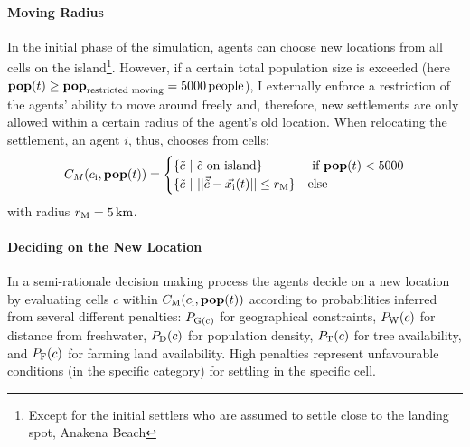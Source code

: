 \paragraph{Moving Radius}
In the initial phase of the simulation, agents can choose new locations from all cells on the island\footnote{Except for the initial settlers who are assumed to settle close to the landing spot, Anakena Beach}.
However, if a certain total population size is exceeded (here $\mathbf{pop}(t)\geq \mathbf{pop}_\text{restricted moving} = 5000 \, \rm{people}$), I externally enforce a restriction of the agents' ability to move around freely and, therefore, new settlements are only allowed within a certain radius of the agent's old location.
When relocating the settlement, an agent $i$, thus, chooses from cells:
\begin{equation}
C_{M}(c_{\rm i}, \mathbf{pop}(t)) = 
\begin{cases}
\{\tilde{c} \ | \ \tilde{c}\text{ on island}\} & \text{ if } \mathbf{pop}(t) <5000 \\
\{\tilde{c} \ | \ | | \vec{\tilde{c}} - \vec{x_{\rm i}}(t) | |
\leq r_{\rm M} \} & \text{else} 
\end{cases}
\end{equation}
with radius $r_{\rm M} = 5\, {\rm km}$.

\paragraph{Deciding on the New Location}
In a semi-rationale decision making process the agents decide on a new location by evaluating cells $c$ within $C_{\rm M} (c_{\rm i}, \mathbf{pop}(t))$ according to probabilities inferred from several different penalties:
$P_{\rm G(c)}$ for geographical constraints, $P_{\rm W}(c)$ for distance from freshwater, $P_{\rm D}(c)$ for population density, $P_{\rm T}(c)$ for tree availability, and $P_{\rm F}(c)$ for farming land availability.
High penalties represent unfavourable conditions (in the specific category) for settling in the specific cell.


